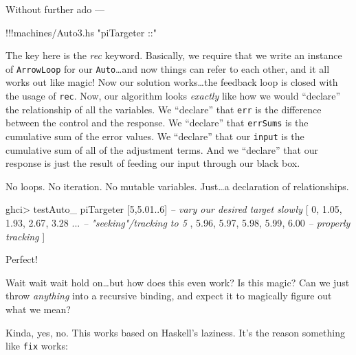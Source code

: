 \documentclass[]{article}
\newenvironment{Shaded}{}{}
\newcommand{\DecValTok}[1]{\textcolor[rgb]{0.25,0.63,0.44}{{#1}}}
\newcommand{\FloatTok}[1]{\textcolor[rgb]{0.25,0.63,0.44}{{#1}}}
\newcommand{\StringTok}[1]{\textcolor[rgb]{0.25,0.44,0.63}{{#1}}}
\newcommand{\CommentTok}[1]{\textcolor[rgb]{0.38,0.63,0.69}{\textit{{#1}}}}
\newcommand{\FunctionTok}[1]{\textcolor[rgb]{0.02,0.16,0.49}{{#1}}}
\newcommand{\NormalTok}[1]{{#1}}
\begin{document}
Without further ado ---

\begin{Shaded}
\begin{Highlighting}[]
\FunctionTok{!!!}\NormalTok{machines}\FunctionTok{/}\NormalTok{Auto3.hs }\StringTok{"piTargeter ::"}
\end{Highlighting}
\end{Shaded}

The key here is the \emph{rec} keyword. Basically, we require that we
write an instance of \texttt{ArrowLoop} for our \texttt{Auto}\ldots{}and
now things can refer to each other, and it all works out like magic! Now
our solution works\ldots{}the feedback loop is closed with the usage of
\texttt{rec}. Now, our algorithm looks \emph{exactly} like how we would
``declare'' the relationship of all the variables. We ``declare'' that
\texttt{err} is the difference between the control and the response. We
``declare'' that \texttt{errSums} is the cumulative sum of the error
values. We ``declare'' that our \texttt{input} is the cumulative sum of
all of the adjustment terms. And we ``declare'' that our response is
just the result of feeding our input through our black box.

No loops. No iteration. No mutable variables. Just\ldots{}a declaration
of relationships.

\begin{Shaded}
\begin{Highlighting}[]
\NormalTok{ghci}\FunctionTok{>} \NormalTok{testAuto_ piTargeter [}\DecValTok{5}\NormalTok{,}\FloatTok{5.01}\FunctionTok{..}\DecValTok{6}\NormalTok{]      }\CommentTok{-- vary our desired target slowly}
\NormalTok{[ }\DecValTok{0}\NormalTok{, }\FloatTok{1.05}\NormalTok{, }\FloatTok{1.93}\NormalTok{, }\FloatTok{2.67}\NormalTok{, }\FloatTok{3.28} \FunctionTok{...}         \CommentTok{-- "seeking"/tracking to 5}
\NormalTok{, }\FloatTok{5.96}\NormalTok{, }\FloatTok{5.97}\NormalTok{, }\FloatTok{5.98}\NormalTok{, }\FloatTok{5.99}\NormalTok{, }\FloatTok{6.00}          \CommentTok{-- properly tracking}
\NormalTok{]}
\end{Highlighting}
\end{Shaded}

Perfect!

Wait wait wait hold on\ldots{}but how does this even work? Is this
magic? Can we just throw \emph{anything} into a recursive binding, and
expect it to magically figure out what we mean?

Kinda, yes, no. This works based on Haskell's laziness. It's the reason
something like \texttt{fix} works:
\end{document}
